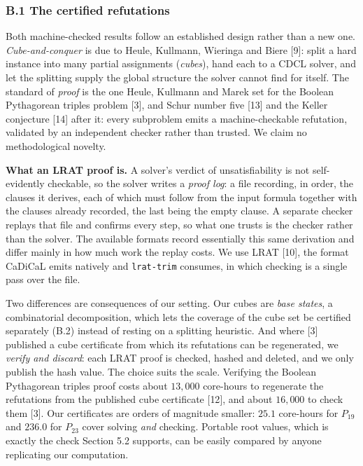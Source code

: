 \documentclass[
]{article}
\begin{document}
\subsubsection{B.1 The certified
refutations}\label{b.1-the-certified-refutations}

Both machine-checked results follow an established design rather than a
new one. \emph{Cube-and-conquer} is due to Heule, Kullmann, Wieringa and
Biere {[}9{]}: split a hard instance into many partial assignments
(\emph{cubes}), hand each to a CDCL solver, and let the splitting supply
the global structure the solver cannot find for itself. The standard of
\emph{proof} is the one Heule, Kullmann and Marek set for the Boolean
Pythagorean triples problem {[}3{]}, and Schur number five {[}13{]} and
the Keller conjecture {[}14{]} after it: every subproblem emits a
machine-checkable refutation, validated by an independent checker rather
than trusted. We claim no methodological novelty.

\textbf{What an LRAT proof is.} A solver's verdict of unsatisfiability
is not self-evidently checkable, so the solver writes a \emph{proof
log}: a file recording, in order, the clauses it derives, each of which
must follow from the input formula together with the clauses already
recorded, the last being the empty clause. A separate checker replays
that file and confirms every step, so what one trusts is the checker
rather than the solver. The available formats record essentially this
same derivation and differ mainly in how much work the replay costs. We
use LRAT {[}10{]}, the format CaDiCaL emits natively and
\texttt{lrat-trim} consumes, in which checking is a single pass over the
file.

Two differences are consequences of our setting. Our cubes are
\emph{base states}, a combinatorial decomposition, which lets the
coverage of the cube set be certified separately (B.2) instead of
resting on a splitting heuristic. And where {[}3{]} published a cube
certificate from which its refutations can be regenerated, we
\emph{verify and discard}: each LRAT proof is checked, hashed and
deleted, and we only publish the hash value. The choice suits the scale.
Verifying the Boolean Pythagorean triples proof costs about \(13{,}000\)
core-hours to regenerate the refutations from the published cube
certificate {[}12{]}, and about \(16{,}000\) to check them {[}3{]}. Our
certificates are orders of magnitude smaller: \(25.1\) core-hours for
\(P_{19}\) and \(236.0\) for \(P_{23}\) cover solving \emph{and}
checking. Portable root values, which is exactly the check Section 5.2
supports, can be easily compared by anyone replicating our computation.
\end{document}
